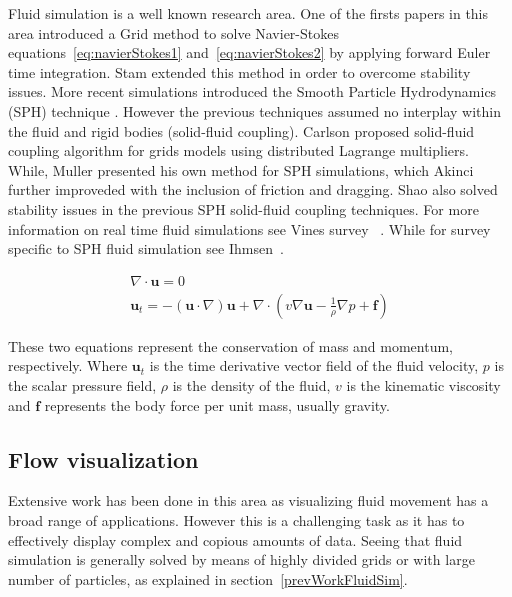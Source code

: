 \documentclass[11pt]{report}
\begin{document}
Fluid simulation is a well known research area. 
One of the firsts papers in this area introduced a Grid method \cite{Foster1996} to solve Navier-Stokes equations~\ref{eq:navierStokes1} and~\ref{eq:navierStokes2} by applying forward Euler time integration. 
Stam \cite{Stam1999} extended this method in order to overcome stability issues.
More recent simulations introduced the Smooth Particle Hydrodynamics (SPH) technique \cite{DesbrunMathieuandGascuel1996}.
However the previous techniques assumed no interplay within the fluid and rigid bodies (solid-fluid coupling).
Carlson \cite{Carlson2004} proposed solid-fluid coupling algorithm for grids models using distributed Lagrange multipliers.
While, Muller \cite{Muller2004} presented his own method for SPH simulations, which Akinci \cite{Akinci2012} further improveded with the inclusion of friction and dragging. 
Shao \cite{Shao2014} also solved stability issues in the previous SPH solid-fluid coupling techniques.
For more information on real time fluid simulations see Vines survey ~\cite{Vines2012}.
While for survey specific to SPH fluid simulation see Ihmsen~\cite{Ihmsen2014}.

\begin{gather}
\label{eq:navierStokes1}
\nabla \cdot \mathbf{u} = 0\\
\label{eq:navierStokes2}
\mathbf{u}_t = -(\mathbf{u} \cdot \nabla)\mathbf{u} + \nabla \cdot ( v \nabla \mathbf{u} - \frac{1}{\rho} \nabla p + \mathbf{f} )
\end{gather}

These two equations represent the conservation of mass and momentum, respectively.
Where $\mathbf{u}_t$ is the time derivative vector field of the fluid velocity, $p$  is the scalar pressure field, $\rho$ is the density of the fluid, $v$ is the kinematic viscosity and $\mathbf{f}$ represents the body force per unit mass, usually gravity.

\subsection{Flow visualization}

Extensive work has been done in this area as visualizing fluid movement has a broad range of applications.
However this is a challenging task as it has to effectively display complex and copious amounts of data.
Seeing that fluid simulation is generally solved by means of highly divided grids or with large number of particles, as explained in section~\ref{prevWorkFluidSim}.\\
\end{document}
